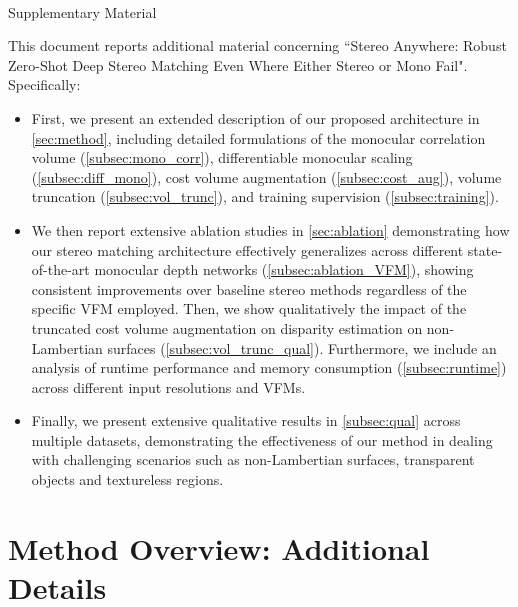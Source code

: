 \clearpage

\onecolumn

{
    \clearpage
    \centering
    \Large
    \textbf{\thetitle}\\
    \vspace{0.5em}Supplementary Material \\
    \vspace{1.0em}
}

This document reports additional material concerning ``Stereo Anywhere: Robust Zero-Shot Deep Stereo Matching Even Where Either Stereo or Mono Fail". Specifically:

\begin{itemize}
    \item First, we present an extended description of our proposed architecture in \cref{sec:method}, including detailed formulations of the monocular correlation volume (\cref{subsec:mono_corr}), differentiable monocular scaling (\cref{subsec:diff_mono}), cost volume augmentation (\cref{subsec:cost_aug}), volume truncation (\cref{subsec:vol_trunc}), and training supervision (\cref{subsec:training}). 

    \item We then report extensive ablation studies in \cref{sec:ablation} demonstrating how our stereo matching architecture effectively generalizes across different state-of-the-art monocular depth networks (\cref{subsec:ablation_VFM}), showing consistent improvements over baseline stereo methods regardless of the specific VFM employed. 
    Then, we show qualitatively the impact of the truncated cost volume augmentation on disparity estimation on non-Lambertian surfaces (\cref{subsec:vol_trunc_qual}). Furthermore, we include an analysis of runtime performance and memory consumption (\cref{subsec:runtime}) across different input resolutions and VFMs.  

    \item Finally, we present extensive qualitative results in \cref{subsec:qual} across multiple datasets, demonstrating the effectiveness of our method in dealing with challenging scenarios such as non-Lambertian surfaces, transparent objects and textureless regions.
\end{itemize}

\section{Method Overview: Additional Details}

